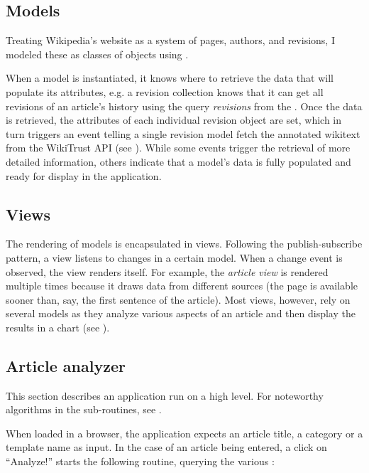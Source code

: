 \subsection{Models}

Treating Wikipedia's website as a system of pages, authors, and revisions, I modeled these as classes of objects using .

When a model is instantiated, it knows where to retrieve the data that will populate its attributes, e.g. a revision collection knows that it can get all revisions of an article's history using the query \emph{revisions} from the  .
Once the data is retrieved, the attributes of each individual revision object are set, which in turn triggers an event telling a single revision model fetch the annotated wikitext from the WikiTrust \ac{API} (see ).
While some events trigger the retrieval of more detailed information, others indicate that a model's data is fully populated and ready for display in the application.

\subsection{Views}

The rendering of models is encapsulated in views.
Following the publish-subscribe pattern, a view listens to changes in a certain model.
When a change event is observed, the view renders itself.
For example, the \emph{article view} is rendered multiple times because it draws data from different sources (the page  is available sooner than, say, the first sentence of the article). 
Most views, however, rely on several models as they analyze various aspects of an article and then display the results in a chart (see ).

\subsection{Article analyzer}

This section describes an application run on a high level.
For noteworthy algorithms in the sub-routines, see .

When loaded in a browser, the application expects an article title, a category or a template name as input.
In the case of an article being entered, a click on ``Analyze!'' starts the following routine, querying the various :

